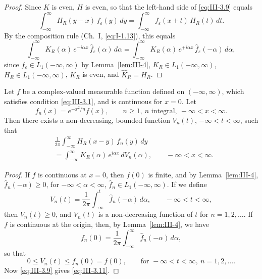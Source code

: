 \begin{proof}
Since $K$ is even, $H$ is even, so that the left-hand side of \eqref{eq:III-3.9} equals
\[
\int_{-\infty}^{\infty}H_{R}(y-x)\,f_{\varepsilon}(y)\,dy
=\int_{-\infty}^{\infty}f_{\varepsilon}(x+t)\,H_{R}(t)\,dt.
\]
By the composition rule (Ch.~I, \eqref{eq:I-1.13}), this equals
\[
\int_{-\infty}^{\infty}K_{R}(\alpha)\,e^{-i\alpha x}\,\hat f_{\varepsilon}(\alpha)\,d\alpha
=\int_{-\infty}^{\infty}K_{R}(\alpha)\,e^{+i\alpha x}\,\hat f_{\varepsilon}(-\alpha)\,d\alpha,
\]
since $f_{\varepsilon}\in L_{1}(-\infty,\infty)$ by Lemma~\ref{lem:III-4}, $K_{R}\in L_{1}(-\infty,\infty)$, $H_{R}\in L_{1}(-\infty,\infty)$, $K_{R}$ is even, and $\hat K_{R}=H_{R}$.
\end{proof}

\begin{lemma}\label{lem:III-6}
Let $f$ be a complex-valued measurable function defined on $(-\infty,\infty)$, which satisfies condition \eqref{eq:III-3.1}, and is continuous for $x=0$. Let
\begin{equation}\tag{3.10}\label{eq:III-3.10}
f_{n}(x)=e^{-x^{2}/n}f(x),\qquad n\ge1,\ n\text{ integral},\ -\infty<x<\infty.
\end{equation}
Then there exists a non-decreasing, bounded function $V_{n}(t)$, $-\infty<t<\infty$, such that
\begin{equation}\tag{3.11}\label{eq:III-3.11}
\begin{aligned}
&\frac{1}{2\pi}  \int_{-\infty}^{\infty}H_{R}(x-y)\,f_{n}(y)\,dy\\
&= \int_{-\infty}^{\infty}K_{R}(\alpha)\,e^{i\alpha x}\,dV_{n}(\alpha),  \qquad - \infty < x < \infty.
\end{aligned}
\end{equation}
\end{lemma}

\begin{proof}
If $f$ is continuous at $x=0$, then $f(0)$ is finite, and by Lemma~\ref{lem:III-4}, $\hat f_{n}(-\alpha)\ge0$, for $-\infty<\alpha<\infty$, $\hat f_{n}\in L_{1}(-\infty,\infty)$. If we define
\begin{equation}\tag{3.12}\label{eq:III-3.12}
V_{n}(t)=\frac{1}{2\pi}\int_{-\infty}^{t}\hat f_{n}(-\alpha)\,d\alpha,\qquad-\infty<t<\infty,
\end{equation}
then $V_{n}(t)\ge0$, and $V_{n}(t)$ is a non-decreasing function of $t$ for $n=1,2,\dots$. If $f$ is continuous at the origin, then, by Lemma~\ref{lem:III-4}, we have
\[
f_{n}(0)=\frac{1}{2\pi}\int_{-\infty}^{\infty}\hat f_{n}(-\alpha)\,d\alpha,
\]
so that
\begin{equation}\tag{3.13}\label{eq:III-3.13}
0\le V_{n}(t)\le f_{n}(0)=f(0),\qquad\text{for }-\infty<t<\infty,\ n=1,2,\dots.
\end{equation}
Now \eqref{eq:III-3.9} gives \eqref{eq:III-3.11}.
\end{proof}

